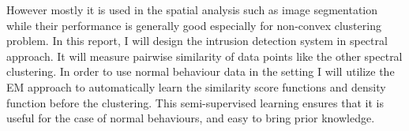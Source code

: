 However mostly it is used in the spatial analysis such as image segmentation while their performance is generally good especially for non-convex clustering problem. 
In this report, I will design the intrusion detection system in spectral approach. 
It will measure pairwise similarity of data points like the other spectral clustering. 
In order to use normal behaviour data in the setting I will utilize the EM approach to automatically learn the similarity score functions and density function before the clustering. 
This semi-supervised learning ensures that it is useful for the case of normal behaviours, and easy to bring prior knowledge. 
